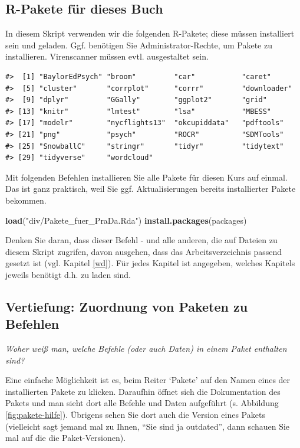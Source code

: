 \documentclass[12pt,ngerman,]{book}
\makeatletter
\newenvironment{Shaded}{\begin{snugshade}}{\end{snugshade}}
\newcommand{\KeywordTok}[1]{\textcolor[rgb]{0.13,0.29,0.53}{\textbf{{#1}}}}
\newcommand{\StringTok}[1]{\textcolor[rgb]{0.31,0.60,0.02}{{#1}}}
\newcommand{\NormalTok}[1]{{#1}}
\newenvironment{kframe}{%
\medskip{}
\setlength{\fboxsep}{.8em}
 \def\at@end@of@kframe{}%
 \ifinner\ifhmode%
  \def\at@end@of@kframe{\end{minipage}}%
  \begin{minipage}{\columnwidth}%
 \fi\fi%
 \def\FrameCommand##1{\hskip\@totalleftmargin \hskip-\fboxsep
 \colorbox{shadecolor}{##1}\hskip-\fboxsep
     \hskip-\linewidth \hskip-\@totalleftmargin \hskip\columnwidth}%
 \MakeFramed {\advance\hsize-\width
   \@totalleftmargin\z@ \linewidth\hsize
   \@setminipage}}%
 {\par\unskip\endMakeFramed%
 \at@end@of@kframe}
\renewenvironment{Shaded}{\begin{kframe}}{\end{kframe}}
\theoremstyle{definition}
\theoremstyle{definition}
\theoremstyle{remark}
\makeatother
\begin{document}
\subsection{R-Pakete für dieses Buch}\label{r-pakete-fur-dieses-buch}

In diesem Skript verwenden wir die folgenden R-Pakete; diese müssen
installiert sein und geladen. Ggf. benötigen Sie Administrator-Rechte,
um Pakete zu installieren. Virenscanner müssen evtl. ausgestaltet sein.

\begin{verbatim}
#>  [1] "BaylorEdPsych" "broom"         "car"           "caret"        
#>  [5] "cluster"       "corrplot"      "corrr"         "downloader"   
#>  [9] "dplyr"         "GGally"        "ggplot2"       "grid"         
#> [13] "knitr"         "lmtest"        "lsa"           "MBESS"        
#> [17] "modelr"        "nycflights13"  "okcupiddata"   "pdftools"     
#> [21] "png"           "psych"         "ROCR"          "SDMTools"     
#> [25] "SnowballC"     "stringr"       "tidyr"         "tidytext"     
#> [29] "tidyverse"     "wordcloud"
\end{verbatim}

Mit folgenden Befehlen installieren Sie alle Pakete für diesen Kurs auf
einmal. Das ist ganz praktisch, weil Sie ggf. Aktualisierungen bereits
installierter Pakete bekommen.

\begin{Shaded}
\begin{Highlighting}[]
\KeywordTok{load}\NormalTok{(}\StringTok{"div/Pakete_fuer_PraDa.Rda"}\NormalTok{)}
\KeywordTok{install.packages}\NormalTok{(packages)}
\end{Highlighting}
\end{Shaded}

Denken Sie daran, dass dieser Befehl - und alle anderen, die auf Dateien
zu diesem Skript zugrifen, davon ausgehen, dass das Arbeitsverzeichnis
passend gesetzt ist (vgl. Kapitel \ref{wd}). Für jedes Kapitel ist
angegeben, welches Kapitels jeweils benötigt d.h. zu laden sind.

\subsection{Vertiefung: Zuordnung von Paketen zu
Befehlen}\label{vertiefung-zuordnung-von-paketen-zu-befehlen}

\emph{Woher weiß man, welche Befehle (oder auch Daten) in einem Paket
enthalten sind?}

Eine einfache Möglichkeit ist es, beim Reiter `Pakete' auf den Namen
eines der installierten Pakete zu klicken. Daraufhin öffnet sich die
Dokumentation des Pakets und man sieht dort alle Befehle und Daten
aufgeführt (s. Abbildung \ref{fig:pakete-hilfe}). Übrigens sehen Sie
dort auch die Version eines Pakets (vielleicht sagt jemand mal zu Ihnen,
``Sie sind ja outdated'', dann schauen Sie mal auf die die
Paket-Versionen).
\end{document}
